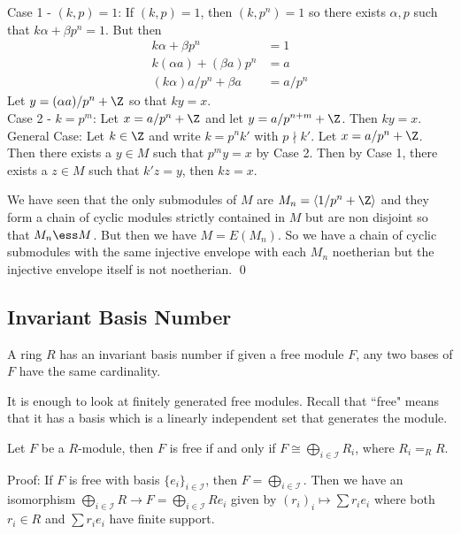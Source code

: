 Case 1 - $(k,p)=1$: If $(k,p)=1$, then $(k,p^n)=1$ so there exists $\alpha,p$ such that $k\alpha+\beta p^n=1$. But then
\[
\begin{split}
k\alpha+\beta p^n&=1 \\
k(\alpha a)+(\beta a)p^n&=a \\
(k\alpha)a/p^n+\beta a&=a/p^n
\end{split}
\]
Let $y=(\alpha a)/p^n+\Z$ so that $ky=x$. \\

Case 2 - $k=p^m$: Let $x=a/p^n+\Z$ and let $y=a/p^{n+m}+\Z$. Then $ky=x$. \\

General Case: Let $k \in \Z$ and write $k=p^nk'$ with $p \nmid k'$. Let $x=a/p^n+\Z$. Then there exists a $y \in M$ such that $p^my=x$ by Case 2. Then by Case 1, there exists a $z \in M$ such that $k'z=y$, then $kz=x$.

We have seen that the only submodules of $M$ are $M_n=\langle 1/p^n +\Z \rangle$ and they form a chain of cyclic modules strictly contained in $M$  but are non disjoint so that $M_n \ess M$. But then we have $M=E(M_n)$. So we have a chain of cyclic submodules with the same injective envelope with each $M_n$ noetherian but the injective envelope itself is not noetherian. \qed \\

\subsection{Invariant Basis Number}

\begin{dfn}
A ring $R$ has an invariant basis number if given a free module $F$, any two bases of $F$ have the same cardinality. 
\end{dfn}

It is enough to look at finitely generated free modules. Recall that ``free" means that it has a basis which is a linearly independent set that generates the module. 

\begin{thm}
Let $F$ be a $R$-module, then $F$ is free if and only if $F \cong \bigoplus_{i \in \mathcal{I}} R_i$, where $R_i=_R R$.
\end{thm}

Proof: If $F$ is free with basis $\{e_i\}_{i \in \mathcal{I}}$, then $F=\bigoplus_{i \in \mathcal{I}}$. Then we have an isomorphism $\bigoplus_{i \in \mathcal{I}} R \rightarrow F=\bigoplus_{i \in \mathcal{I}} Re_i$ given by $(r_i)_i \mapsto \sum r_i e_i$ where both $r_i \in R$ and $\sum r_i e_i$ have finite support. 

